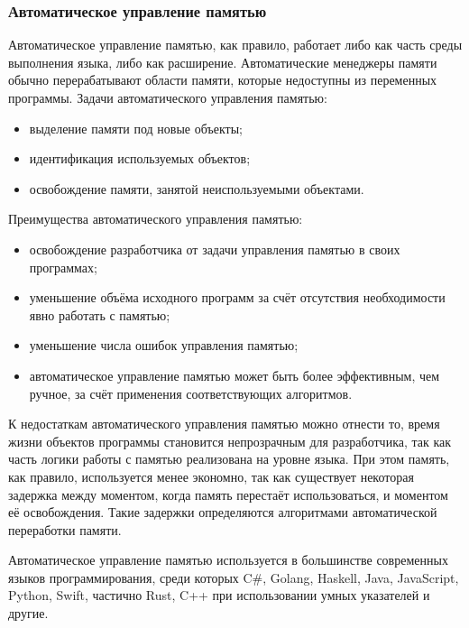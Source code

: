\subsubsection*{Автоматическое управление памятью}

Автоматическое управление памятью, как правило, работает либо как часть среды выполнения языка, либо как расширение. Автоматические менеджеры памяти обычно перерабатывают области памяти, которые недоступны из переменных программы. Задачи автоматического управления памятью:~\cite{mm_overview}

\begin{itemize}[label*=---]
	\item выделение памяти под новые объекты;
	\item идентификация используемых объектов;
	\item освобождение памяти, занятой неиспользуемыми объектами.
\end{itemize}

Преимущества автоматического управления памятью: 

\begin{itemize}[label*=---]
	\item освобождение разработчика от задачи управления памятью в своих программах;
	\item уменьшение объёма исходного программ за счёт отсутствия необходимости явно работать с памятью;
	\item уменьшение числа ошибок управления памятью;
	\item автоматическое управление памятью может быть более эффективным, чем ручное, за счёт применения соответствующих алгоритмов.
\end{itemize}

К недостаткам автоматического управления памятью можно отнести то, время жизни объектов программы становится непрозрачным для разработчика, так как часть логики работы с памятью реализована на уровне языка. При этом память, как правило, используется менее экономно, так как существует некоторая задержка между моментом, когда память перестаёт использоваться, и моментом её освобождения. Такие задержки определяются алгоритмами автоматической переработки памяти.

Автоматическое управление памятью используется в большинстве современных языков программирования, среди которых C\#, Golang, Haskell, Java, JavaScript, Python, Swift, частично Rust, C++ при использовании умных указателей и другие.

